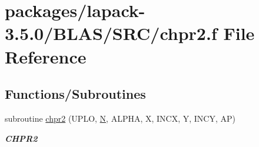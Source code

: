 \hypertarget{lapack-3_85_80_2BLAS_2SRC_2chpr2_8f}{}\section{packages/lapack-\/3.5.0/\+B\+L\+A\+S/\+S\+R\+C/chpr2.f File Reference}
\label{lapack-3_85_80_2BLAS_2SRC_2chpr2_8f}
\subsection*{Functions/\+Subroutines}
\begin{DoxyCompactItemize}
\item 
subroutine \hyperlink{group__complex__blas__level2_ga537b8bcd05cbe626ebce0fbc8d66a2d6}{chpr2} (U\+P\+L\+O, \hyperlink{polmisc_8c_a0240ac851181b84ac374872dc5434ee4}{N}, A\+L\+P\+H\+A, X, I\+N\+C\+X, Y, I\+N\+C\+Y, A\+P)
\begin{DoxyCompactList}\small\item\em {\bfseries C\+H\+P\+R2} \end{DoxyCompactList}\end{DoxyCompactItemize}

